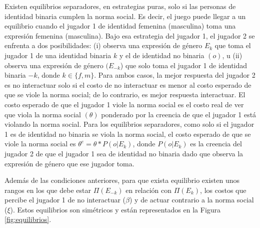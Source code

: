 Existen equilibrios separadores, en estrategias puras, solo si las personas de identidad binaria cumplen la norma social. Es decir, el juego puede llegar a un equilibrio cuando el jugador 1 de identidad femenina (masculina) toma una expresión femenina (masculina). Bajo esa estrategia del jugador 1, el jugador 2 se enfrenta a dos posibilidades: (i) observa una expresión de género $E_k$ que toma el jugador 1 de una identidad binaria $k$ y el de identidad no binaria $(o)$, u (ii) observa una expresión de género $(E_{-k}$) que solo toma el jugador 1 de identidad binaria $-k$, donde $k \in \{f,m\}$. Para ambos casos, la mejor respuesta del jugador 2 es no interactuar solo si el costo de no interactuar es menor al costo esperado de que se viole la norma social; de lo contrario, es mejor respuesta interactuar. El costo esperado de que el jugador 1 viole la norma social es el costo real de ver que viola la norma social $(\theta)$ ponderado por la creencia de que el jugador 1 está violando la norma social. Para los equilibrios separadores, como solo si el jugador 1 es de identidad no binaria se viola la norma social, el costo esperado de que se viole la norma social es $\theta^e=\theta*P(o|E_k)$, donde $P(o|E_k)$ es la creencia del jugador 2 de que el jugador 1 sea de identidad no binaria dado que observa la expresión de género que ese jugador toma. 

Además de las condiciones anteriores, para que exista equilibrio existen unos rangos en los que debe estar $\Pi(E_{-k})$  en relación con $\Pi(E_k)$, los costos que percibe el jugador 1 de no interactuar ($\beta$) y de actuar contrario a la norma social ($\xi$). Estos equilibrios son simétricos y están representados en la Figura \ref{fig:equilibrios}.

